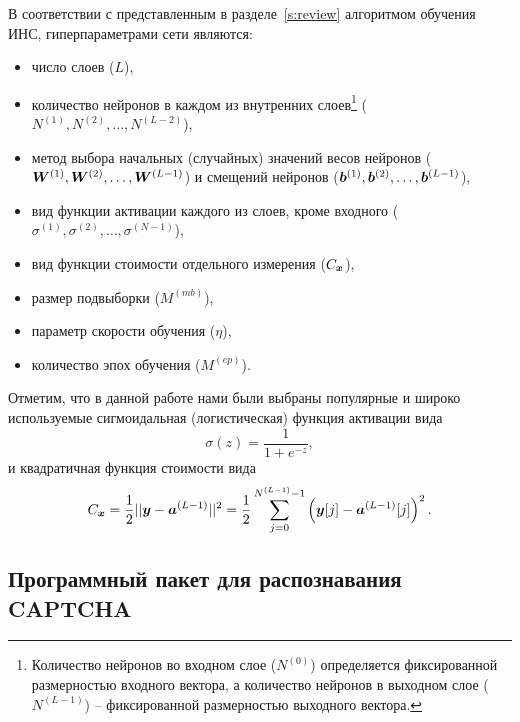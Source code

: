 \documentclass[a4paper,12pt,russian]{article} %
\begin{document}
В соответствии с представленным в разделе~\ref{s:review} алгоритмом обучения ИНС, гиперпараметрами сети являются: 
\begin{itemize}
	\item число слоев ($L$),
	\item количество нейронов в каждом из внутренних слоев\footnote{
		Количество нейронов во входном слое ($N^{(0)}$) определяется фиксированной размерностью входного вектора, а количество нейронов в выходном слое ($N^{(L-1)}$) -- фиксированной размерностью выходного вектора.
	}
	($N^{(1)}, N^{(2)}, \ldots, N^{(L-2)}$),
	\item метод выбора начальных (случайных) значений весов нейронов ($\bm{W}^{(1)}, \bm{W}^{(2)}, \ldots, \bm{W}^{(L-1)}$) и смещений нейронов ($\bm{b}^{(1)}, \bm{b}^{(2)}, \ldots, \bm{b}^{(L-1)}$),
	\item вид функции активации каждого из слоев, кроме входного ($\sigma^{(1)}, \sigma^{(2)}, \ldots, \sigma^{(N-1)}$),
	\item вид функции стоимости отдельного измерения ($C_{\bm{x}}$),
	\item размер подвыборки ($M^{(mb)}$),
	\item параметр скорости обучения ($\eta$),
	\item количество эпох обучения ($M^{(ep)}$).
\end{itemize}

Отметим, что в данной работе нами были выбраны популярные и широко используемые сигмоидальная (логистическая) функция активации вида
$$
	\sigma(z) = \frac{1}{1+e^{-z}},
$$
и квадратичная функция стоимости вида
\begin{equation} 
	C_{\bm{x}} = 
		\frac{1}{2} || \bm{y} - \bm{a}^{(L-1)} ||^2 =
		\frac{1}{2} \sum_{j=0}^{N^{(L-1)}-1} \left( \bm{y}[j] - \bm{a}^{(L-1)}[j] \right)^2.
\end{equation}

\newpage
\subsection{Программный пакет для распознавания CAPTCHA} \label{ss:soft_package}
\end{document}
